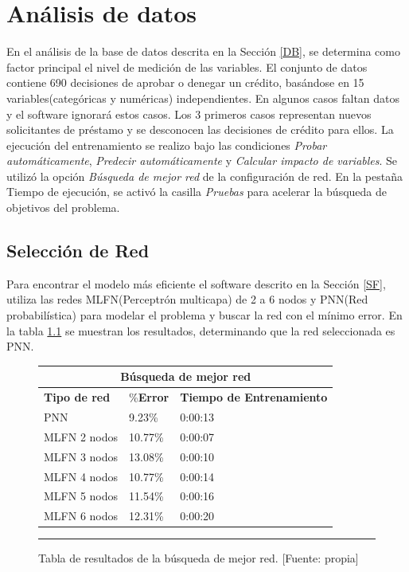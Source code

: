 \documentclass[11pt,titlepage]{report}
\begin{document}
\chapter{Análisis de datos} 

En el análisis de la base de datos descrita en la Sección \ref{DB}, se determina como factor principal el nivel de medición de las variables. El conjunto de datos contiene 690 decisiones de aprobar o denegar un crédito, basándose en 15 variables(categóricas y numéricas) independientes.  En algunos casos faltan datos y el software ignorará estos casos. Los 3 primeros casos representan nuevos solicitantes de préstamo y se desconocen las decisiones de crédito para ellos. La ejecución del entrenamiento se realizo bajo las condiciones \textit{Probar automáticamente}, \textit{Predecir automáticamente} y \textit{Calcular impacto de variables}. Se utilizó la opción \textit{Búsqueda de mejor red} de la configuración de red. En la pestaña Tiempo de ejecución, se activó la casilla \textit{Pruebas} para acelerar la búsqueda de objetivos del problema. 

\section{Selección de Red}
Para encontrar el modelo más eficiente el software descrito en la Sección \ref{SF}, utiliza las redes MLFN(Perceptrón multicapa) de 2 a 6 nodos y PNN(Red probabilística) para modelar el problema y buscar la red con el mínimo error. En la tabla \ref{23} se muestran los resultados,  determinando que la red seleccionada es PNN.

\begin{figure}[h] \centering
\begin{tabular}{| m{4cm} | m{3cm} | m{5cm} |} \hline
\multicolumn{3}{|c|}{\textbf{Búsqueda de mejor red} }\\ \hline
\textbf{Tipo de red} &	\%\textbf{Error} &	\textbf{Tiempo de Entrenamiento}\\ \hline
PNN	        &    9.23\%	& 0:00:13\\ \hline
MLFN 2 nodos&	10.77\%	& 0:00:07\\ \hline
MLFN 3 nodos&	13.08\%	& 0:00:10\\ \hline
MLFN 4 nodos&	10.77\%	& 0:00:14\\ \hline
MLFN 5 nodos&	11.54\%	& 0:00:16\\ \hline
MLFN 6 nodos&	12.31\%	& 0:00:20\\ \hline
\end{tabular}
\caption{Tabla de resultados de la búsqueda de mejor red. [Fuente: propia]\label{23}}
\hrule 
\end{figure}
\end{document}
